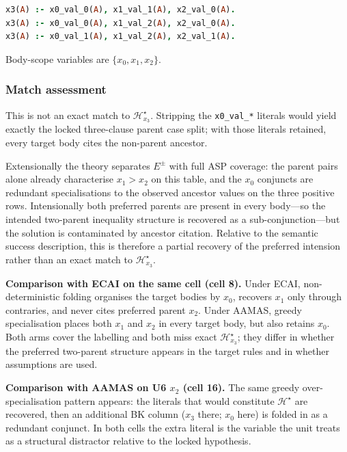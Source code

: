 \documentclass[11pt]{article}
\begin{document}
\begin{lstlisting}[style=logic,language=Prolog]
x3(A) :- x0_val_0(A), x1_val_1(A), x2_val_0(A).
x3(A) :- x0_val_0(A), x1_val_2(A), x2_val_0(A).
x3(A) :- x0_val_1(A), x1_val_2(A), x2_val_1(A).
\end{lstlisting}

Body-scope variables are \(\{x_0,x_1,x_2\}\).

\subsubsection{Match assessment}

This is not an exact match to \(\mathcal{H}_{x_3}^\star\). Stripping the \texttt{x0\_val\_*} literals would yield exactly the locked three-clause parent case split; with those literals retained, every target body cites the non-parent ancestor.

Extensionally the theory separates \(E^\pm\) with full ASP coverage: the parent pairs alone already characterise \(x_1>x_2\) on this table, and the \(x_0\) conjuncts are redundant specialisations to the observed ancestor values on the three positive rows. Intensionally both preferred parents are present in every body---so the intended two-parent inequality structure is recovered as a sub-conjunction---but the solution is contaminated by ancestor citation. Relative to the semantic success description, this is therefore a partial recovery of the preferred intension rather than an exact match to \(\mathcal{H}_{x_3}^\star\).

\textbf{Comparison with ECAI on the same cell (cell 8).} Under ECAI, non-deterministic folding organises the target bodies by \(x_0\), recovers \(x_1\) only through contraries, and never cites preferred parent \(x_2\). Under AAMAS, greedy specialisation places both \(x_1\) and \(x_2\) in every target body, but also retains \(x_0\). Both arms cover the labelling and both miss exact \(\mathcal{H}_{x_3}^\star\); they differ in whether the preferred two-parent structure appears in the target rules and in whether assumptions are used.

\textbf{Comparison with AAMAS on U6 \(x_2\) (cell 16).} The same greedy over-specialisation pattern appears: the literals that would constitute \(\mathcal{H}^\star\) are recovered, then an additional BK column (\(x_3\) there; \(x_0\) here) is folded in as a redundant conjunct. In both cells the extra literal is the variable the unit treats as a structural distractor relative to the locked hypothesis.
\end{document}
